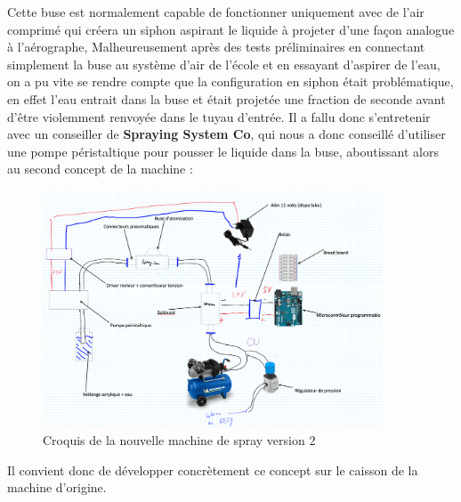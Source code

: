 Cette buse est normalement capable de fonctionner uniquement avec de l'air comprimé qui créera un siphon aspirant le liquide à projeter d'une façon analogue à l'aérographe,
Malheureusement après des tests préliminaires en connectant simplement la buse au système d'air de l'école et en essayant d'aspirer de l'eau, on a pu vite se rendre compte que la
configuration en siphon était problématique, en effet l'eau entrait dans la buse et était projetée une fraction de seconde avant d'être violemment renvoyée dans le tuyau d'entrée.
Il a fallu donc s'entretenir avec un conseiller de \textbf{Spraying System Co}, qui nous a donc conseillé d'utiliser une pompe péristaltique pour pousser le liquide dans la buse,
aboutissant alors au second concept de la machine :
\begin{figure}[H]
    \centering
    \includegraphics[width = 0.9\textwidth]{assets/figures/ameliorations/Croquis_machine_ecran_ver_2.png}
    \caption[Croquis nouvelle machine de spray ver. 2]{Croquis de la nouvelle machine de spray version 2}
    \label{fig:croquis_machine_V2}
\end{figure}


Il convient donc de développer concrètement ce concept sur le caisson de la machine d'origine.

\newpage
